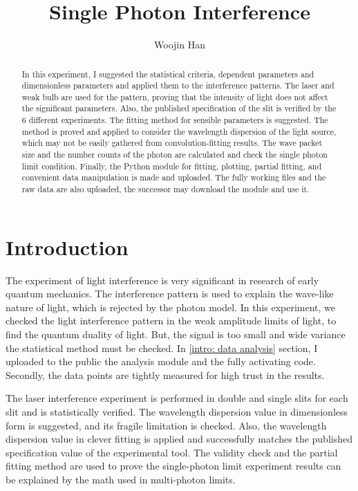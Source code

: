 \documentclass{article}
\begin{document}
\title{Single Photon Interference}
\author[1]{Woojin Han}
\maketitle

\begin{abstract}
  In this experiment, I suggested the statistical criteria, dependent parameters and dimensionless parameters and applied them to the interference patterns.
  The laser and weak bulb are used for the pattern, proving that the intensity of light does not affect the significant parameters.
  Also, the published specification of the slit is verified by the 6 different experiments.
  The fitting method for sensible parameters is suggested.
  The method is proved and applied to consider the wavelength dispersion of the light source, which may not be easily gathered from convolution-fitting results.
  The wave packet size and the number counts of the photon are calculated and check the single photon limit condition.
  Finally, the Python module for fitting, plotting, partial fitting, and convenient data manipulation is made and uploaded.
  The fully working files and the raw data are also uploaded, the successor may download the module and use it.
\end{abstract}

\section{Introduction}
 The experiment of light interference is very significant in research of early quantum mechanics.
The interference pattern is used to explain the wave-like nature of light, which is rejected by the photon model.
In this experiment, we checked the light interference pattern in the weak amplitude limits of light, to find the quantum duality of light.
But, the signal is too small and wide variance the statistical method must be checked.
In \ref{intro: data analysis} section, I uploaded to the public the analysis module and the fully activating code.
Secondly, the data points are tightly measured for high trust in the results.

The laser interference experiment is performed in double and single slits for each slit and is statistically verified.
The wavelength dispersion value in dimensionless form is suggested, and its fragile limitation is checked.
Also, the wavelength dispersion value in clever fitting is applied and successfully matches the published specification value of the experimental tool.
The validity check and the partial fitting method are used to prove the single-photon limit experiment results can be explained by the math used in multi-photon limits.
\end{document}
